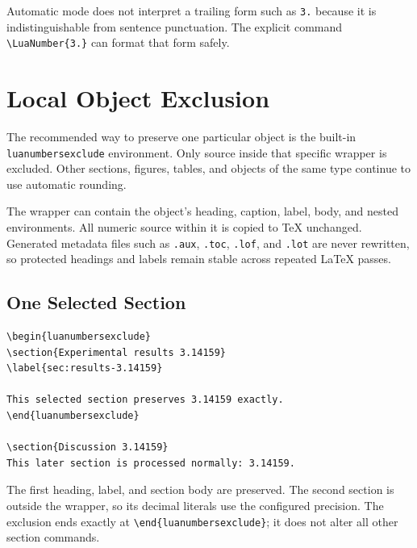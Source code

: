 \documentclass[11pt]{article}
\begin{document}
Automatic mode does not interpret a trailing form such as \texttt{3.} because
it is indistinguishable from sentence punctuation. The explicit command
\verb|\LuaNumber{3.}| can format that form safely.

\section{Local Object Exclusion}

The recommended way to preserve one particular object is the built-in
\texttt{luanumbersexclude} environment. Only source inside that specific
wrapper is excluded. Other sections, figures, tables, and objects of the same
type continue to use automatic rounding.

The wrapper can contain the object's heading, caption, label, body, and nested
environments. All numeric source within it is copied to TeX unchanged.
Generated metadata files such as \texttt{.aux}, \texttt{.toc}, \texttt{.lof},
and \texttt{.lot} are never rewritten, so protected headings and labels remain
stable across repeated LaTeX passes.

\subsection{One Selected Section}

\begin{lstlisting}[style=latexinput]
\begin{luanumbersexclude}
\section{Experimental results 3.14159}
\label{sec:results-3.14159}

This selected section preserves 3.14159 exactly.
\end{luanumbersexclude}

\section{Discussion 3.14159}
This later section is processed normally: 3.14159.
\end{lstlisting}

The first heading, label, and section body are preserved. The second section
is outside the wrapper, so its decimal literals use the configured precision.
The exclusion ends exactly at \verb|\end{luanumbersexclude}|; it does not alter
all other section commands.
\end{document}
